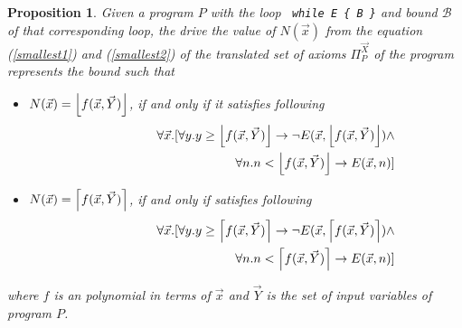 \documentclass{article}
\DeclarePairedDelimiter\ceil{\lceil}{\rceil}
\DeclarePairedDelimiter\floor{\lfloor}{\rfloor}
\newtheorem{prop}{Proposition}
\begin{document}
\begin{prop}\label{propostion4}Given a program $P$ with the loop \verb- while E { B }-  and bound $\mathcal{B}$ of that corresponding loop, the drive the value of $N(\vec{x})$  from the equation (\ref{smallest1}) and (\ref{smallest2}) of the translated set of axioms $\Pi_{P}^{\vec{X}}$ of the program represents the bound such that 
\begin{itemize}
    \item $N(\vec{x})=\floor*{f(\vec{x},\vec{Y})}$, if and only if it satisfies following
    \begin{eqnarray}
    &&\hspace*{-4em}\forall \vec{x}.[\forall y.y\geq \floor*{f(\vec{x},\vec{Y})} \rightarrow \neg E(\vec{x},\floor*{f(\vec{x},\vec{Y})}) \land \nonumber\\
    &&\hspace*{10em}\forall n. n< \floor*{f(\vec{x},\vec{Y})}\rightarrow  E(\vec{x},n)] \label{smallest5}
   \end{eqnarray}
    
    \item $N(\vec{x})=\ceil*{f(\vec{x},\vec{Y})}$, if and only if satisfies following
    \begin{eqnarray}
    &&\hspace*{-4em}\forall \vec{x}.[\forall y.y\geq \ceil*{f(\vec{x},\vec{Y})} \rightarrow \neg E(\vec{x},\ceil*{f(\vec{x},\vec{Y})}) \land \nonumber\\
    &&\hspace*{10em}\forall n. n< \ceil*{f(\vec{x},\vec{Y})}\rightarrow  E(\vec{x},n)]\label{smallest6}
   \end{eqnarray}
\end{itemize}
where $f$ is an polynomial in terms of $\vec{x}$ and $\vec{Y}$ is the set of input variables of program $P$.

\end{prop}
\end{document}
